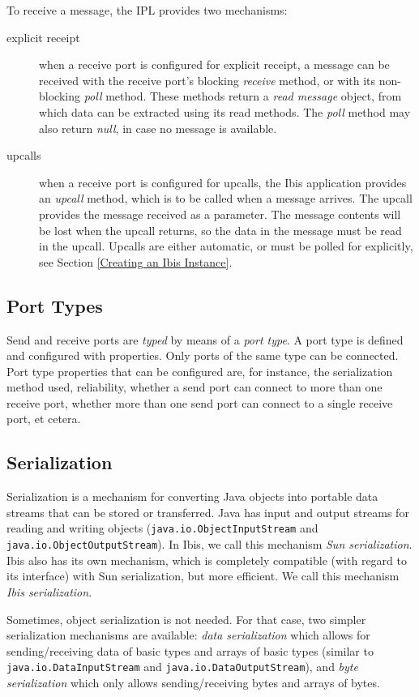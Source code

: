 \documentclass[10pt]{article}
\newcommand{\mysubsection}[1]{\subsection{#1}\label{#1}}
\begin{document}
To receive a message, the IPL provides two mechanisms:
\begin{description}
\item[explicit receipt]
when a receive port is configured for explicit receipt, a message can be
received with the receive port's blocking \emph{receive} method,
or with its non-blocking \emph{poll} method.
These methods return a \emph{read message} object, from which data can
be extracted using its read methods. The \emph{poll} method may also
return \emph{null}, in case no message is available.
\item[upcalls]
when a receive port is configured for upcalls, the Ibis application provides
an \emph{upcall} method, which is to be called when a message arrives.
The upcall provides the message received as a parameter.
The message contents will be lost when the upcall returns, so the data
in the message must be read in the upcall.
Upcalls are either automatic, or must be polled for explicitly, see Section
\ref{Creating an Ibis Instance}.
\end{description}
\noindent

\mysubsection{Port Types}

Send and receive ports are \emph{typed} by means of a \emph{port type}.
A port type is defined and configured with properties.
Only ports of the same type can be connected.
Port type properties that can be configured are, for instance, the
serialization method used, reliability, whether a send port can connect
to more than one receive port, whether more than one send port can connect
to a single receive port, et cetera.

\mysubsection{Serialization}

Serialization is a mechanism for converting Java objects
into portable data streams that can be stored or transferred.  Java
has input
and output
streams for reading and writing
objects
(\texttt{java.io.ObjectInputStream} and \texttt{java.io.ObjectOutputStream}).
In Ibis, we call this mechanism \emph{Sun serialization}.
Ibis also has its own mechanism, which is completely compatible (with
regard to its interface) with Sun serialization, but more efficient.
We call this mechanism \emph{Ibis serialization}.

Sometimes, object serialization is not needed. For that case,
two simpler serialization mechanisms are available: \emph{data
serialization} which allows for sending/receiving data of basic types
and arrays of basic types (similar to \texttt{java.io.DataInputStream}
and \texttt{java.io.DataOutputStream}), and \emph{byte serialization}
which only allows sending/receiving bytes and arrays of bytes.
\end{document}
